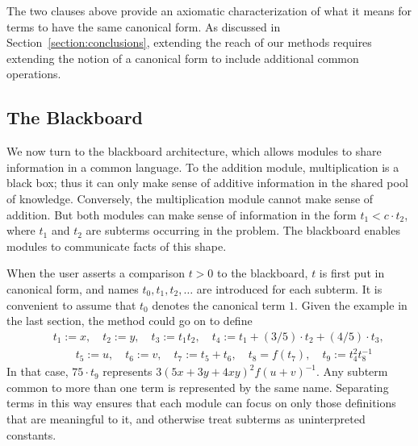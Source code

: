 \documentclass[runningheds]{llncs}
\begin{document}
The two clauses above provide an axiomatic characterization of what it means for terms to have the same canonical form. As discussed in Section~\ref{section:conclusions}, extending the reach of our methods requires extending the notion of a canonical form to include additional common operations. 


\subsection{The Blackboard}
\label{subsection:blackboard}

We now turn to the blackboard architecture, which allows modules to share information in a common language. To the addition module, multiplication is a black box; thus it can only make sense of additive information in the shared pool of knowledge. Conversely, the multiplication module cannot make sense of addition. But both modules can make sense of information in the form $t_1 < c \cdot t_2$, where $t_1$ and $t_2$ are subterms occurring in the problem. The blackboard enables modules to communicate facts of this shape. 

When the user asserts a comparison $t > 0$ to the blackboard, $t$ is first put in canonical form, and names $t_0, t_1, t_2, \ldots$ are introduced for each subterm. It is convenient to assume that $t_0$ denotes the canonical term $1$. Given the example in the last section, the method could go on to define
\begin{eqnarray*}
& & t_1 := x, \quad t_2 := y, \quad t_3 := t_1 t_2, \quad 
t_4 := t_1 + (3/5) \cdot t_2 + (4/5) \cdot t_3, \\
& & \quad \quad t_5 := u, \quad t_6 := v, \quad t_7 := t_5 + t_6, \quad t_8 = f(t_7), \quad t_9 := t_4^2 t_8^{-1}
\end{eqnarray*}
In that case, $75 \cdot t_9$ represents $3 (5x + 3y + 4 x y)^2 f(u + v)^{-1}$. Any subterm common to more than one term is represented by the same name. Separating terms in this way ensures that each module can focus on only those definitions that are meaningful to it, and otherwise treat subterms as uninterpreted constants.
\end{document}
